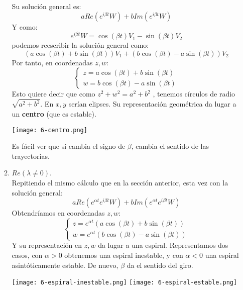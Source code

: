 \begin{enumerate}
\begin{enumerate}
        Su solución general es:
        $$
            a Re(e^{i\beta t} W) + b Im(e^{i \beta t} W)
        $$
        Y como:
        $$
            e^{i\beta t} W = \cos(\beta t) V_1 - \sin(\beta t)V_2
        $$
        podemos reescribir la solución general como:
        $$
            (a \cos(\beta t) + b \sin(\beta t))V_1 + (b \cos(\beta t) - a \sin(\beta t))V_2
        $$
        Por tanto, en coordenadas $z, w$:
        $$
            \begin{cases}
                z = a \cos(\beta t) + b \sin(\beta t)\\
                w = b \cos(\beta t) - a \sin(\beta t)
            \end{cases}
        $$
        Esto quiere decir que como $z^2 + w^2 = a^2 + b^2$ , tenemos círculos de radio $\sqrt{a^2+b^2}$. En $x, y$ serían elipses. Su representación geométrica da lugar a un \textbf{centro} (que es estable).
        \begin{center}
            \texttt{[image: 6-centro.png]}
        \end{center}
        Es fácil ver que si cambia el signo de $\beta$, cambia el sentido de las trayectorias.
        \item $Re(\lambda \neq 0)$.\\
        Repitiendo el mismo cálculo que en la sección anterior, esta vez con la solución general:
        $$
            a Re(e^{\alpha t} e^{i\beta t} W) + b Im(e^{\alpha t}e^{i \beta t} W)
        $$
        Obtendríamos en coordenadas $z, w$:
        $$
            \begin{cases}
                z = e^{\alpha t} (a \cos(\beta t) + b \sin(\beta t))\\
                w = e^{\alpha t} (b \cos(\beta t) - a \sin(\beta t))
            \end{cases}
        $$
        Y su representación en $z, w$ da lugar a una espiral. Representamos dos casos, con $\alpha > 0$ obtenemos una espiral inestable, y con $\alpha < 0$ una espiral asintóticamente estable. De nuevo, $\beta$ da el sentido del giro.
        \begin{center}
            \texttt{[image: 6-espiral-inestable.png]}
            \texttt{[image: 6-espiral-estable.png]}
        \end{center}
    \end{enumerate}
\end{enumerate}
